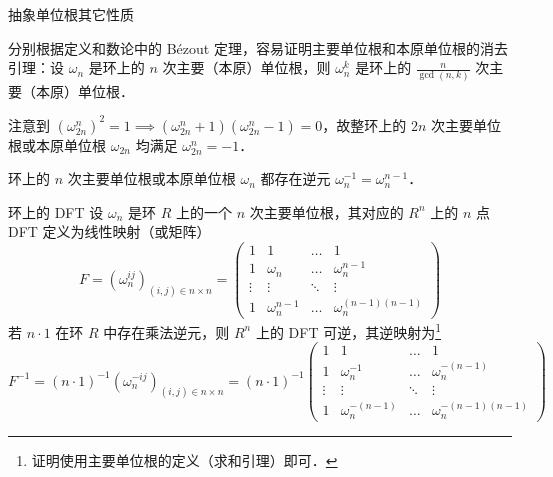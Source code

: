 \documentclass[fontset=fandol]{ctexbeamer}
\newcommand{\myemph}[1]{{\usebeamercolor[fg]{structure} #1}}
\begin{document}
\begin{frame}{抽象单位根}{其它性质}
    
    分别根据定义和数论中的 B{\'e}zout 定理，容易证明主要单位根和本原单位根的消去引理：设 $\omega_{n}$ 是环上的 $n$ 次主要（本原）单位根，则 $\omega_{n}^{k}$ 是环上的 $\frac n {\gcd(n,k)}$ 次主要（本原）单位根．
    
    注意到 $\left(\omega_{2n}^n \right)^2=1 \implies (\omega_{2n}^n + 1)(\omega_{2n}^n - 1)=0$，故整环上的 $2n$ 次主要单位根或本原单位根 $\omega_{2n}$ 均满足 $\omega_{2n}^n = -1$．

    环上的 $n$ 次主要单位根或本原单位根 $\omega_n$ 都存在逆元 $\omega_n^{-1} = \omega_n^{n-1}$．
\end{frame}

\begin{frame}{环上的 DFT}
    设 $\omega_n$ 是环 $R$ 上的一个 $n$ 次主要单位根，其对应的 $R^n$ 上的 \myemph{$n$ 点 DFT} 定义为线性映射（或矩阵）
    \[
    F = \left( \omega_n^{ij} \right)_{(i,j) \in n \times n} = \begin{pmatrix}
    1 & 1 & \dots & 1 \\
    1 & \omega_n & \dots & \omega_n^{n-1} \\
    \vdots & \vdots & \ddots & \vdots \\
    1 & \omega_n^{n-1} & \dots & \omega_n^{(n-1)(n-1)}
    \end{pmatrix}
    \]
    若 $n \cdot 1$ 在环 $R$ 中存在乘法逆元，则 $R^n$ 上的 DFT 可逆，其逆映射为\footnote{证明使用主要单位根的定义（求和引理）即可．}
    \[
    F^{-1} = (n \cdot 1)^{-1} \left( \omega_n^{-ij} \right)_{(i,j) \in n \times n} = (n \cdot 1)^{-1} \begin{pmatrix}
    1 & 1 & \dots & 1 \\
    1 & \omega_n^{-1} & \dots & \omega_n^{-(n-1)} \\
    \vdots & \vdots & \ddots & \vdots \\
    1 & \omega_n^{-(n-1)} & \dots & \omega_n^{-(n-1)(n-1)}
    \end{pmatrix}
    \]
\end{frame}
\end{document}
